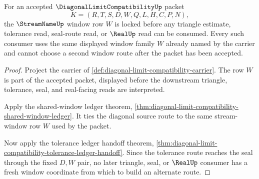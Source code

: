 \begin{theorem}
\label{thm:diagonal-limit-compatibility-window-route-lock}
For an accepted $\DiagonalLimitCompatibilityUp$ packet
$$
K=(R,T,S,D,W,Q,L,H,C,P,N),
$$
the $\StreamNameUp$ window row $W$ is locked before any triangle estimate,
tolerance read, seal-route read, or $\RealUp$ read can be consumed. Every such
consumer uses the same displayed window family $W$ already named by the
carrier and cannot choose a second window route after the packet has been
accepted.
\end{theorem}
\begin{proof}
Project the carrier of \autoref{def:diagonal-limit-compatibility-carrier}.
The row $W$ is part of the accepted packet, displayed before the downstream
triangle, tolerance, seal, and real-facing reads are interpreted.

Apply the shared-window ledger theorem,
\autoref{thm:diagonal-limit-compatibility-shared-window-ledger}. It ties the
diagonal source route to the same stream-window row $W$ used by the packet.

Now apply the tolerance ledger handoff theorem,
\autoref{thm:diagonal-limit-compatibility-tolerance-ledger-handoff}. Since
the tolerance route reaches the seal through the fixed $D,W$ pair, no later
triangle, seal, or $\RealUp$ consumer has a fresh window coordinate from
which to build an alternate route.
\end{proof}

